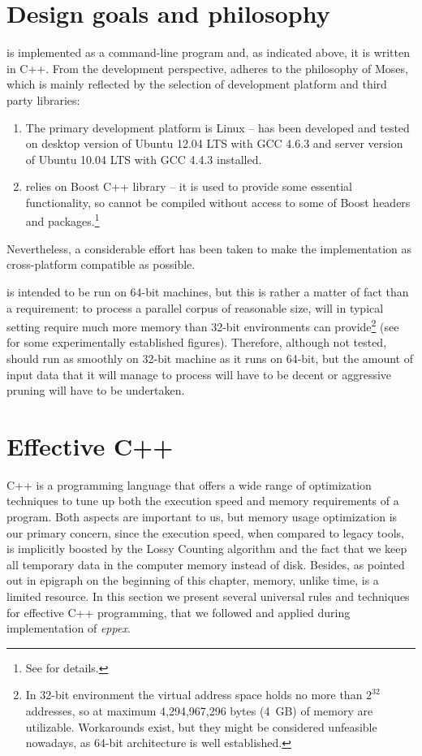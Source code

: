 \section{Design goals and philosophy}

\Eppex{} is implemented as a command-line program and, as indicated above, it is written in C++.
From the development perspective, \eppex{} adheres to the philosophy of Moses, which is mainly
reflected by the selection of development platform and third party libraries:
\begin{enumerate}
  \item The primary development platform is Linux --
  \eppex{} has been developed and tested on desktop version of Ubuntu 12.04 LTS with GCC 4.6.3 and
  server version of Ubuntu 10.04 LTS with GCC 4.4.3 installed.
  \item \Eppex{} relies on Boost C++ library -- it is used to provide
  some essential functionality, so \eppex{} cannot be compiled without access to some of Boost
  headers and packages.\footnote{See  for details.}
\end{enumerate}
Nevertheless, a considerable effort has been taken to make the implementation as cross-platform
compatible as possible.

\Eppex{} is intended to be run on 64-bit machines, but this is rather a matter of fact than
a requirement: to process a parallel corpus of reasonable size, \eppex{} will in typical
setting require much more memory than 32-bit environments can provide\footnote{In 32-bit
environment the virtual address space holds no more than $2^{32}$ addresses, so at maximum
4,294,967,296 bytes (4~GB) of memory are utilizable. Workarounds exist, but they might be
considered unfeasible nowadays, as 64-bit architecture is well established.} (see
 for some experimentally established figures).
Therefore, although not tested, \eppex{} should run as smoothly on 32-bit machine as it runs
on 64-bit, but the amount of input data that it will manage to process will have to be decent
or aggressive pruning will have to be undertaken.

\section{Effective C++}

C++ is a programming language that offers a wide range of optimization techniques to
tune up both the execution speed and memory requirements of a program.
Both aspects are important to us, but memory usage optimization is our primary concern,
since the execution speed, when compared to legacy tools, is implicitly boosted by
the Lossy Counting algorithm and the fact that we keep all temporary data in the computer
memory instead of disk.
Besides, as pointed out in epigraph on the beginning of this chapter, memory, unlike time,
is a limited resource.
In this section we present several universal rules and techniques for effective C++
programming, that we followed and applied during implementation of \emph{eppex}.

